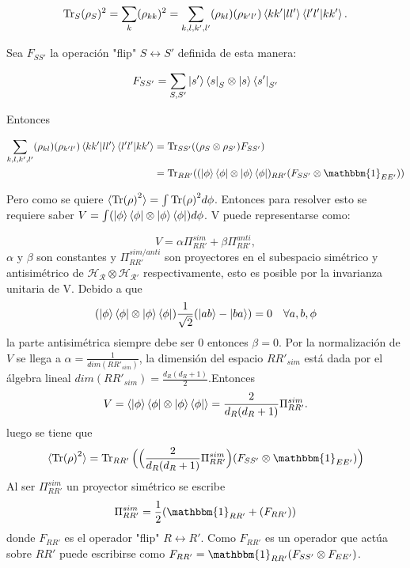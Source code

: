 \begin{equation}
\Tr_{S} (\rho_{S})^2 = \sum_{k} (\rho_{kk})^{2} = \sum_{k,l,k',l'}(\rho_{kl})(\rho_{k'l'}) \bra{kk'}\ket{ll'}\bra{l'l'}\ket{kk'}.
\end{equation}

Sea $F_{SS'}$ la operación "flip" $S \longleftrightarrow S'$ definida de esta manera:

\begin{equation}
F_{SS'} =\sum_{S,S'} \ket{s'}\bra{s}_{S} \otimes \ket{s}\bra{s'}_{S'}
\end{equation}

Entonces

\begin{align*} 
\sum_{k,l,k',l'}(\rho_{kl})(\rho_{k'l'}) \bra{kk'}\ket{ll'}\bra{l'l'}\ket{kk'} &= \Tr_{SS'} ((\rho_{S} \otimes \rho_{S'})F_{SS'})\\
\quad &=\Tr_{RR'}((\ket{\phi} \bra{\phi} \otimes \ket{\phi} \bra{\phi})_{RR'}(F_{SS'} \otimes \mathbbm{1}_{EE'}))
\end{align*}



Pero como se quiere $\langle \Tr (\rho)^{2} \rangle= \int \Tr (\rho)^{2} d\phi $. Entonces para resolver esto se requiere saber $V=\int (\ket{\phi} \bra{\phi} \otimes \ket{\phi} \bra{\phi})d\phi$. V puede representarse como:

\begin{equation}
V= \alpha \Pi_{RR'}^{sim} + \beta \Pi_{RR'}^{anti},
\end{equation}
$\alpha$ y $\beta$ son constantes y $\Pi_{RR'}^{sim/anti}$ son proyectores en el subespacio simétrico y antisimétrico de $\mathcal{H_{R} \otimes H_{R'}}$ respectivamente, esto es posible por la invarianza unitaria de V. Debido a que 	
\begin{equation}
(\ket{\phi} \bra{\phi} \otimes \ket{\phi} \bra{\phi})\frac{1}{\sqrt{2}} ( \ket{ab} -\ket{ba})=0  \quad  \forall a,b,\phi
\end{equation}
la parte antisimétrica siempre debe ser 0 entonces $\beta=0$. Por la normalización de $V$ se llega a $\alpha= \frac{1}{dim(RR'_{sim})}$, la dimensión del espacio $RR'_{sim}$ está dada por el álgebra lineal $dim(RR'_{sim})= \frac{d_{R}(d_{R}+1)}{2}$.Entonces
\begin{equation}
V= \langle \ket{\phi} \bra{\phi} \otimes \ket{\phi} \bra{\phi} \rangle = \frac{2}{d_{R}(d_{R} +1)} \Pi_{RR'}^{sim}.
\end{equation}
luego se tiene que 
\begin{equation}
\langle \Tr (\rho)^{2} \rangle = \Tr_{RR'} \Big( \Big( \frac{2}{d_{R}(d_{R} +1)} \Pi_{RR'}^{sim} \Big)(F_{SS'} \otimes \mathbbm{1}_{EE'}) \Big)
\end{equation}
Al ser $\Pi_{RR'}^{sim}$ un proyector simétrico se escribe
\begin{equation}
\Pi_{RR'}^{sim}=\frac{1}{2}(\mathbbm{1}_{RR'}+(F_{RR'} ))
\end{equation}
donde $F_{RR'}$ es el operador "flip"  $R \longleftrightarrow R'$. Como $F_{RR'}$ es un operador que actúa sobre $RR'$ puede escribirse como $F_{RR'}= \mathbbm{1}_{RR'}(F_{SS'} \otimes F_{EE'})$.

